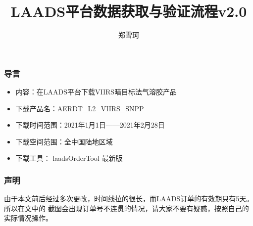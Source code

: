 \documentclass{ctexbeamer}
\title{LAADS平台数据获取与验证流程v2.0}
\author{郑雪珂}
\institute{lengfeng1453@hotmail.com}
\begin{document}
\frame{\titlepage}
\begin{frame}
  \frametitle{导言}
  \begin{itemize}
    \item 内容：在LAADS平台下载VIIRS暗目标法气溶胶产品
    \item 下载产品名：AERDT\_L2\_VIIRS\_SNPP
    \item 下载时间范围：2021年1月1日——2021年2月28日
    \item 下载空间范围：全中国陆地区域
    \item 下载工具： laadsOrderTool 最新版
  \end{itemize}
\end{frame}
\begin{frame}
  \frametitle{声明}
  由于本文前后经过多次更改，时间线拉的很长，而LAADS订单的有效期只有5天。所以在文中的
  截图会出现订单号不连贯的情况，请大家不要有疑惑，按照自己的实际情况操作。

  

\end{frame}




\end{document}
